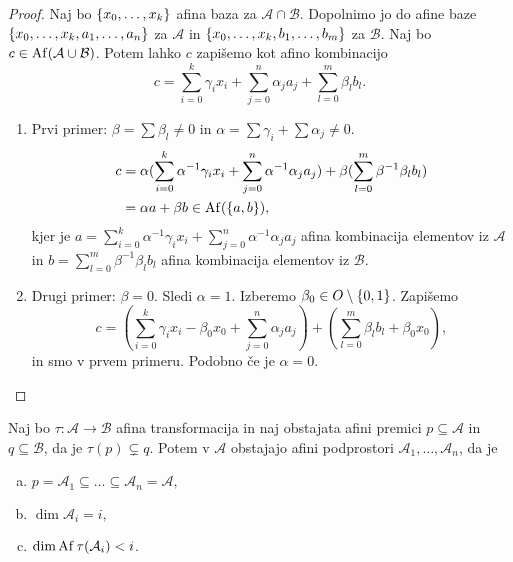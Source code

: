 \begin{proof}
    Naj bo $\left\{x_0, \dots, x_k\right\}$ afina baza za $\mathcal{A} \cap \mathcal{B}$. Dopolnimo jo do afine baze \\
    $\left\{x_0, \dots, x_k, a_1, \dots, a_n\right\}$ za $\mathcal{A}$ in $\left\{x_0, \dots, x_k, b_1, \dots, b_m\right\}$ za $\mathcal{B}$.
    Naj bo $c \in \operatorname{Af} (\mathcal{A} \cup \mathcal{B})$. Potem lahko $c$ zapišemo kot afino kombinacijo
    \[
    c = \sum_{i=0}^k \gamma_i x_i + \sum_{j=0}^n \alpha_j a_j + \sum_{l=0}^m \beta_l b_l.
    \]
    \begin{enumerate}
        \item Prvi primer: $\beta = \sum \beta_l \neq 0$ in $\alpha = \sum \gamma_i + \sum \alpha_j \neq 0$.
        \begin{align*} %
          c &= \alpha (\sum_{i=0}^k \alpha^{-1} \gamma_i x_i + \sum_{j=0}^n \alpha^{-1} \alpha_j a_j) + \beta (\sum_{l=0}^m \beta^{-1} \beta_l b_l) \\
          &= \alpha a + \beta b \in \Af (\set{a,b}),
        \end{align*}
        kjer je $a =\sum_{i=0}^k \alpha^{-1} \gamma_i x_i + \sum_{j=0}^n \alpha^{-1} \alpha_j a_j$ afina kombinacija elementov iz $\mathcal{A}$ in $b = \sum_{l=0}^m \beta^{-1} \beta_l b_l$ afina kombinacija elementov iz $\mathcal{B}$.
        \item Drugi primer: $\beta = 0$. Sledi $\alpha = 1$. Izberemo $\beta_0 \in O \setminus \left\{0,1\right\}$. Zapišemo 
        \[
            c = (\sum_{i=0}^k \gamma_i x_i - \beta_0 x_0 + \sum_{j=0}^n \alpha_j a_j) + (\sum_{l=0}^m \beta_l b_l + \beta_0 x_0),
        \]
        in smo v prvem primeru. Podobno če je $\alpha = 0$.
    \end{enumerate}
\end{proof}

\begin{lema*}
    Naj bo $\tau \colon \mathcal{A} \to \mathcal{B}$ afina transformacija in naj obstajata afini premici $p \subseteq \mathcal{A}$ in $q \subseteq \mathcal{B}$, da je $\tau (p) \subsetneq q$. Potem v $\mathcal{A}$ obstajajo afini podprostori $\mathcal{A}_1, \dots, \mathcal{A}_n$, da je
    \begin{enumerate}[a)]
        \item $p = \mathcal{A}_1 \subseteq \dots \subseteq \mathcal{A}_n = \mathcal{A},$
        \item $\dim \mathcal{A}_i = i,$
        \item $\dim \operatorname{Af} \tau(\mathcal{A}_i) < i$.
    \end{enumerate}
\end{lema*}

